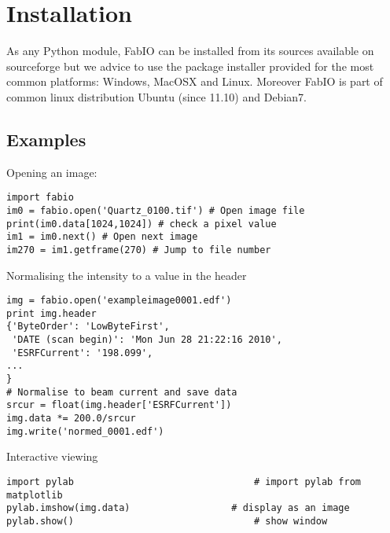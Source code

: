 \documentclass{iucr}
\begin{document}
\section{Installation}

As any Python module, FabIO can be installed from its sources available on sourceforge\cite{fabio}
but we advice to use the package installer provided for the most common
platforms: Windows, MacOSX and Linux. Moreover FabIO is part of common linux
distribution Ubuntu (since 11.10) and Debian7.

\subsection{Examples}

Opening an image:

\begin{verbatim}
import fabio     
im0 = fabio.open('Quartz_0100.tif') # Open image file
print(im0.data[1024,1024]) # check a pixel value
im1 = im0.next() # Open next image
im270 = im1.getframe(270) # Jump to file number
\end{verbatim}

Normalising the intensity to a value in the header

\begin{verbatim}
img = fabio.open('exampleimage0001.edf')
print img.header
{'ByteOrder': 'LowByteFirst',
 'DATE (scan begin)': 'Mon Jun 28 21:22:16 2010',
 'ESRFCurrent': '198.099',
...
}
# Normalise to beam current and save data
srcur = float(img.header['ESRFCurrent'])
img.data *= 200.0/srcur
img.write('normed_0001.edf')
\end{verbatim}

Interactive viewing

\begin{verbatim}
import pylab								# import pylab from matplotlib
pylab.imshow(img.data)					# display as an image
pylab.show()								# show window
\end{verbatim}

\end{document}
